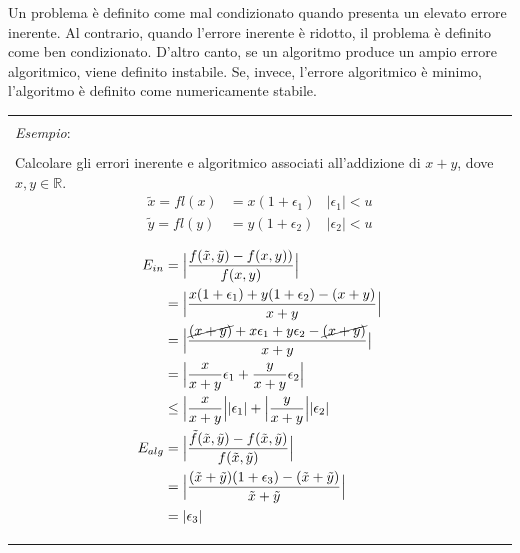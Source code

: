 \documentclass{article}
\newenvironment{example}
{\begin{center}
        \begin{tabular}{|p{0.9\textwidth}|}
            \hline \\ 
            \textit{Esempio}: \\\\ 
        }
        {
            \\\\ \hline
        \end{tabular}
    \end{center}
}
\begin{document}
Un problema è definito come mal condizionato quando presenta un elevato errore inerente.
Al contrario, quando l'errore inerente è ridotto, il problema è definito come ben condizionato. 
D'altro canto, se un algoritmo produce un ampio errore algoritmico, viene
definito instabile.
Se, invece, l'errore algoritmico è minimo, l'algoritmo è definito come numericamente stabile.

\begin{example}
    Calcolare gli errori inerente e algoritmico associati all'addizione di
    $x+y$, dove $x,y\in \mathbb{R}$.
    \begin{equation*}
        \begin{aligned}
            \tilde{x}=fl(x) &= x(1+\epsilon_1) & |\epsilon_1| < u \\
            \tilde{y}=fl(y) &= y(1+\epsilon_2) & |\epsilon_2| < u \\
        \end{aligned} 
     \end{equation*}
    \begin{equation*}
       \begin{aligned}
           E_{in}&= \Big\lvert \frac{f(\tilde{x},\tilde{y})-f(x,y))}{f(x,y)}\Big\rvert\\
            &=\Big\lvert
           \frac{x(1+\epsilon_1)+y(1+\epsilon_2)-(x+y)}{x+y}\Big\rvert \\
                 &=\Big\lvert
                     \frac{\cancel{(x+y)}+x\epsilon_1+y\epsilon_2-\cancel{(x+y)}}{x+y}
                    \big\rvert \\ 
                &=\Big\lvert
                \frac{x}{x+y}\epsilon_1+\frac{y}{x+y}\epsilon_2\Big\rvert\\ 
                &\leq \Big\lvert \frac{x}{x+y}\Big\rvert \lvert
                \epsilon_1\rvert + \Big\lvert \frac{y}{x+y}\Big\rvert \lvert
                \epsilon_2\rvert\\
           E_{alg}&=\Big\lvert
           \frac{\tilde{f}(\tilde{x},\tilde{y})-f(\tilde{x},\tilde{y})}{f(\tilde{x},\tilde{y})}\Big\rvert
           \\ 
                &= \Big\lvert
                \frac{(\tilde{x}+\tilde{y})(1+\epsilon_3)-(\tilde{x}+\tilde{y})}{\tilde{x}+\tilde{y}}\Big\rvert\\
                &= \lvert \epsilon_3\rvert
       \end{aligned} 
    \end{equation*}
\end{example}
\end{document}
